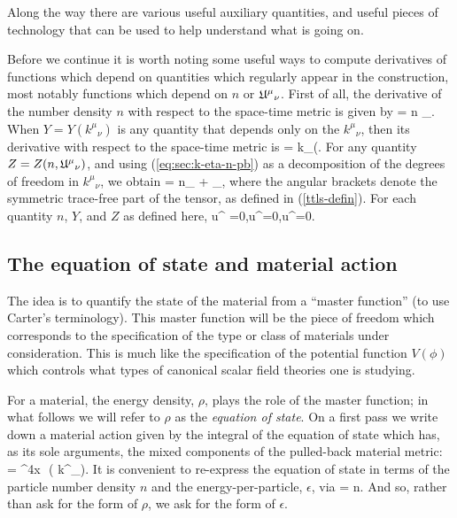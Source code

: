 Along the way there are various useful auxiliary quantities, and useful pieces of technology that can be used to help understand what is going on.

 
 
Before we continue it is worth noting some useful ways to compute derivatives of functions which depend on quantities which regularly appear in the construction, most notably functions which depend on $n$ or ${\mathfrak{U}^{\mu}}_{\nu}$.
First of all, the derivative of the number density $n$ with respect to the space-time metric is given by
\bea
\label{eq:sec:dndg}
 = \half n \gamma_{\mu\nu}.
\eea
When $Y = Y({k^{\mu}}_{\nu})$ is any quantity that depends only on the ${k^{\mu}}_{\nu}$,  then its derivative with respect to the space-time metric is
\bea
\label{eq:pd-Y-g-k}
 = k_{\alpha(\mu}.
\eea
For any quantity $Z = Z(n,{\mathfrak{U}^{\mu}}_{\nu})$, and using (\ref{eq:sec:k-eta-n-pb}) as a decomposition of the degrees of freedom in ${k^{\mu}}_{\nu}$, we obtain
\bea
\label{eq:sec:Zneta}
 = \half n\gamma_{\mu\nu} + \unimod_{\alpha\langle \mu},
\eea
where the angular brackets denote the symmetric trace-free part of the tensor, as defined in (\ref{ttls-defin}). For each quantity $n$, $Y$, and $Z$ as defined here,
\bea
u^{\mu} =0,\qquad u^{\mu}=0,\qquad u^{\mu}=0.
\eea
% 

 
\subsection{The equation of state and material action}
\label{sec:eos-introd}
The idea is to quantify the state of the material  from a ``master function'' (to use Carter's terminology). This master function will be the piece of freedom which corresponds to the specification of the type or class of materials under consideration. This is much like the specification of the potential function $V(\phi)$ which controls what types of canonical scalar field theories one is studying. 

For a material, the energy density, $\rho$,    plays the role of the master function; in what follows we will refer to $\rho$ as the \textit{equation of state}. On a first pass  we write down a material action given by the integral of the equation of state which has, as its sole arguments, the mixed components of the pulled-back material metric:
\bea
\label{material-action-k-no-invaraints-1}
 =  \int \dd^4x\,\, \rho\left( {k^{\mu}}_{\nu}\right).
\eea 
It is convenient to re-express the equation of state in terms of the particle number density $n$ and the energy-per-particle, $\epsilon$, via
\bea
\label{eq:decomp_n_rho_ep}
\rho = n\epsilon.
\eea
And so, rather than ask for the form of $\rho$, we ask for the form of $\epsilon$.

